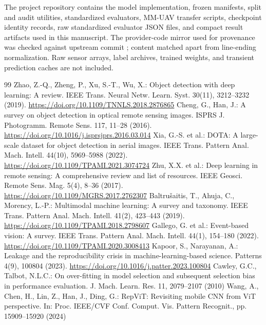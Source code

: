 The project repository contains the model implementation, frozen manifests, split and audit utilities, standardized evaluators, MM-UAV transfer scripts, checkpoint identity records, raw standardized evaluator JSON files, and compact result artifacts used in this manuscript. The provider-code mirror used for provenance was checked against upstream commit ; content matched apart from line-ending normalization. Raw sensor arrays, label archives, trained weights, and transient prediction caches are not included.

\sloppy
\begin{thebibliography}{99}
 Zhao, Z.-Q., Zheng, P., Xu, S.-T., Wu, X.: Object detection with deep learning: A review. IEEE Trans. Neural Netw. Learn. Syst. 30(11), 3212--3232 (2019). \url{https://doi.org/10.1109/TNNLS.2018.2876865}
 Cheng, G., Han, J.: A survey on object detection in optical remote sensing images. ISPRS J. Photogramm. Remote Sens. 117, 11--28 (2016). \url{https://doi.org/10.1016/j.isprsjprs.2016.03.014}
 Xia, G.-S. et al.: DOTA: A large-scale dataset for object detection in aerial images. IEEE Trans. Pattern Anal. Mach. Intell. 44(10), 5969--5988 (2022). \url{https://doi.org/10.1109/TPAMI.2021.3074724}
 Zhu, X.X. et al.: Deep learning in remote sensing: A comprehensive review and list of resources. IEEE Geosci. Remote Sens. Mag. 5(4), 8--36 (2017). \url{https://doi.org/10.1109/MGRS.2017.2762307}
 Baltru\v{s}aitis, T., Ahuja, C., Morency, L.-P.: Multimodal machine learning: A survey and taxonomy. IEEE Trans. Pattern Anal. Mach. Intell. 41(2), 423--443 (2019). \url{https://doi.org/10.1109/TPAMI.2018.2798607}
 Gallego, G. et al.: Event-based vision: A survey. IEEE Trans. Pattern Anal. Mach. Intell. 44(1), 154--180 (2022). \url{https://doi.org/10.1109/TPAMI.2020.3008413}
 Kapoor, S., Narayanan, A.: Leakage and the reproducibility crisis in machine-learning-based science. Patterns 4(9), 100804 (2023). \url{https://doi.org/10.1016/j.patter.2023.100804}
 Cawley, G.C., Talbot, N.L.C.: On over-fitting in model selection and subsequent selection bias in performance evaluation. J. Mach. Learn. Res. 11, 2079--2107 (2010)
 Wang, A., Chen, H., Lin, Z., Han, J., Ding, G.: RepViT: Revisiting mobile CNN from ViT perspective. In: Proc. IEEE/CVF Conf. Comput. Vis. Pattern Recognit., pp. 15909--15920 (2024)

\end{thebibliography}
